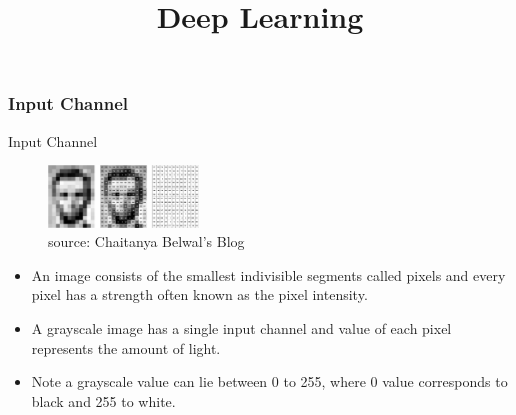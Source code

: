 




\newcommand{\titlefigure}{figure/stride4.png}
\newcommand{\learninggoals}{
  \item Input Channel
  \item Padding
  \item Stride
  \item Pooling

}

\title{Deep Learning}
\date{}






\frametitle{Input Channel}

\begin{vbframe}{Input Channel}
         \begin{figure}
    \centering
    \includegraphics[width=4cm]{figure/gray.png}
        \caption{\tiny source: Chaitanya Belwal's Blog}
  \end{figure}
    \begin{itemize}
    
       \item An image consists of the smallest indivisible segments called pixels and every pixel has a strength often known as the pixel intensity. 
       
       \item A grayscale image has a single input channel and value of each pixel represents the amount of light.
       
       \item Note a grayscale value can lie between 0 to 255, where 0 value corresponds to black and 255 to white.
       
       
    \end{itemize}

\end{vbframe}

